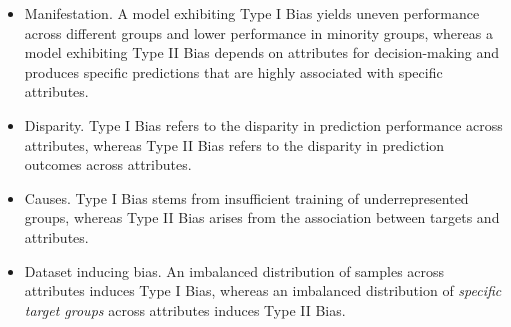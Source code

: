 \begin{itemize}

    \item Manifestation. A model exhibiting Type I Bias yields uneven performance across different groups and lower performance in minority groups, whereas a model exhibiting Type II Bias depends on attributes for decision-making and produces specific predictions that are highly associated with specific attributes. 
    
    \item Disparity. Type I Bias refers to the disparity in prediction performance across attributes, whereas Type II Bias refers to the disparity in prediction outcomes across attributes.
    
    \item Causes. Type I Bias stems from insufficient training of underrepresented groups, whereas Type II Bias arises from the association between targets and attributes.
    
    \item Dataset inducing bias. An imbalanced distribution of samples across attributes induces Type I Bias, whereas an imbalanced distribution of \emph{specific target groups} across attributes induces Type II Bias.
    
\end{itemize}




































